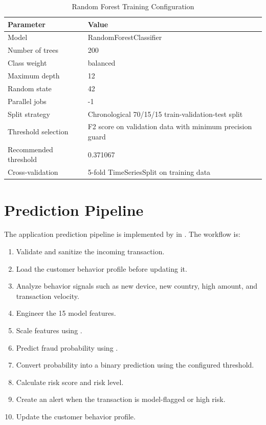 \documentclass[12pt,a4paper]{report}
\begin{document}
\begin{table}[H]
\centering
\caption{Random Forest Training Configuration}
\begin{tabular}{|p{}|p{}|}
\hline
\textbf{Parameter} & \textbf{Value} \\ \hline
Model & RandomForestClassifier \\ \hline
Number of trees & 200 \\ \hline
Class weight & balanced \\ \hline
Maximum depth & 12 \\ \hline
Random state & 42 \\ \hline
Parallel jobs & -1 \\ \hline
Split strategy & Chronological 70/15/15 train-validation-test split \\ \hline
Threshold selection & F2 score on validation data with minimum precision guard \\ \hline
Recommended threshold & 0.371067 \\ \hline
Cross-validation & 5-fold TimeSeriesSplit on training data \\ \hline
\end{tabular}
\end{table}

\section{Prediction Pipeline}
The application prediction pipeline is implemented by  in . The workflow is:
\begin{enumerate}
    \item Validate and sanitize the incoming transaction.
    \item Load the customer behavior profile before updating it.
    \item Analyze behavior signals such as new device, new country, high amount, and transaction velocity.
    \item Engineer the 15 model features.
    \item Scale features using .
    \item Predict fraud probability using .
    \item Convert probability into a binary prediction using the configured threshold.
    \item Calculate risk score and risk level.
    \item Create an alert when the transaction is model-flagged or high risk.
    \item Update the customer behavior profile.
\end{enumerate}
\end{document}
